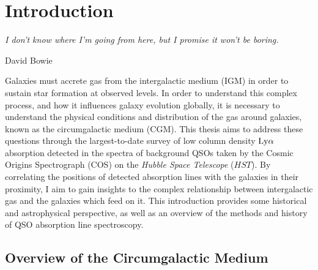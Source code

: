 \chapter[Introduction]{Introduction}
\label{chap:intro}

\vspace*{\fill}


\epigraph{\fixspacing\emph{I don't know where I'm going from here,
but I promise it won't be boring.}}{David Bowie}


\graphicspath{{Introduction/figures/}}

\clearpage


Galaxies must accrete gas from the intergalactic medium (IGM) in order to sustain star formation at observed levels. In order to understand this complex process, and how it influences galaxy evolution globally, it is necessary to understand the physical conditions and distribution of the gas around galaxies, known as the circumgalactic medium (CGM). This thesis aims to address these questions through the largest-to-date survey of low column density $\rm Ly\alpha$ absorption detected in the spectra of background QSOs taken by the Cosmic Origins Spectrograph (COS) on the \emph{Hubble Space Telescope} ($HST$). By correlating the positions of detected absorption lines with the galaxies in their proximity, I aim to gain insights to the complex relationship between intergalactic gas and the galaxies which feed on it. This introduction provides some historical and astrophysical perspective, as well as an overview of the methods and history of QSO absorption line spectroscopy.


\section{Overview of the Circumgalactic Medium}

